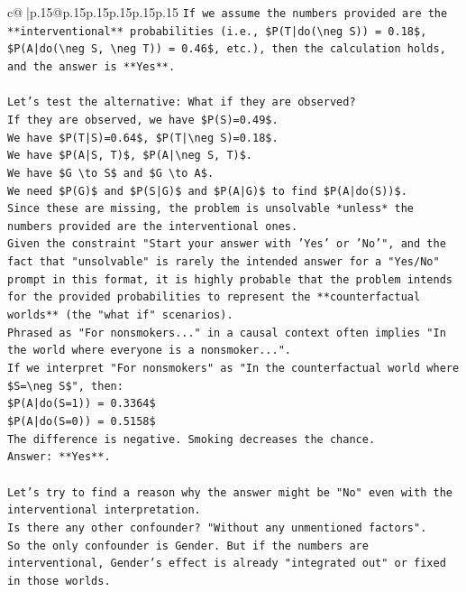 \documentclass{article}
\begin{document}
{\begin{supertabular}{c@{$\;$}|p{.15\linewidth}@{}p{.15\linewidth}p{.15\linewidth}p{.15\linewidth}p{.15\linewidth}p{.15\linewidth}}
{{{\texttt{If we assume the numbers provided are the **interventional** probabilities (i.e., \$P(T|do(\textbackslash{}neg S)) = 0.18\$, \$P(A|do(\textbackslash{}neg S, \textbackslash{}neg T)) = 0.46\$, etc.), then the calculation holds, and the answer is **Yes**.} \\
\\ 
\texttt{Let's test the alternative: What if they are observed?} \\
\texttt{If they are observed, we have \$P(S)=0.49\$.} \\
\texttt{We have \$P(T|S)=0.64\$, \$P(T|\textbackslash{}neg S)=0.18\$.} \\
\texttt{We have \$P(A|S, T)\$, \$P(A|\textbackslash{}neg S, T)\$.} \\
\texttt{We have \$G \textbackslash{}to S\$ and \$G \textbackslash{}to A\$.} \\
\texttt{We need \$P(G)\$ and \$P(S|G)\$ and \$P(A|G)\$ to find \$P(A|do(S))\$.} \\
\texttt{Since these are missing, the problem is unsolvable *unless* the numbers provided are the interventional ones.} \\
\texttt{Given the constraint "Start your answer with 'Yes' or 'No'", and the fact that "unsolvable" is rarely the intended answer for a "Yes/No" prompt in this format, it is highly probable that the problem intends for the provided probabilities to represent the **counterfactual worlds** (the "what if" scenarios).} \\
\texttt{Phrased as "For nonsmokers..." in a causal context often implies "In the world where everyone is a nonsmoker...".} \\
\texttt{If we interpret "For nonsmokers" as "In the counterfactual world where \$S=\textbackslash{}neg S\$", then:} \\
\texttt{\$P(A|do(S=1)) = 0.3364\$} \\
\texttt{\$P(A|do(S=0)) = 0.5158\$} \\
\texttt{The difference is negative. Smoking decreases the chance.} \\
\texttt{Answer: **Yes**.} \\
\\ 
\texttt{Let's try to find a reason why the answer might be "No" even with the interventional interpretation.} \\
\texttt{Is there any other confounder? "Without any unmentioned factors".} \\
\texttt{So the only confounder is Gender. But if the numbers are interventional, Gender's effect is already "integrated out" or fixed in those worlds.} \\
}}}
\end{supertabular}}
\end{document}
